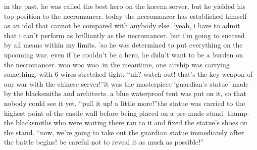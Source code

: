 in the past, he was called the best hero on the korean server, but he yielded his top position to the necromancer.
 today the necromancer has established himself as an idol that cannot be compared with anybody else.
‘yeah, i have to admit that i can’t perform as brilliantly as the necromancer.
 but i’m going to succeed by all means within my limits.
’so he was determined to put everything on the upcoming war.
 even if he couldn’t be a hero, he didn’t want to be a burden on the necromancer.
woo woo woo~in the meantime, one airship was carrying something, with 6 wires stretched tight.
“uh? watch out! that’s the key weapon of our war with the chinese server!”it was the masterpiece ‘guardian’s statue’ made by the blacksmiths and architects.
a blue waterproof tent was put on it, so that nobody could see it yet.
“pull it up! a little more!”the statue was carried to the highest point of the castle wall before being placed on a pre-made stand.
thump-the blacksmiths who were waiting there ran to it and fixed the statue’s shoes on the stand.
“now, we’re going to take out the guardian statue immediately after the battle begins! be careful not to reveal it as much as possible!”

 